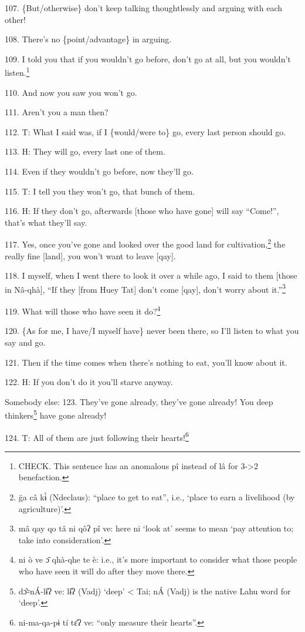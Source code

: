 107. \{But/otherwise\} don't keep talking thoughtlessly and arguing with each other!

108. There's no \{point/advantage\} in arguing.

109. I told you that if you wouldn't go before, don't go at all, but you wouldn't
listen.\footnote{CHECK. This sentence has an anomalous pî instead of lâ for 3->2 benefaction.}

110. And now you saw you won't go.

111. Aren't you a man then?

112. T: What I said was, if I \{would/were to\} go, every last person should go.

113. H: They will go, every last one of them.

114. Even if they wouldn't go before, now they'll go.

115. T: I tell you they won't go, that bunch of them.

116. H: If they don't go, afterwards [those who have gone] will say ``Come!'',
that's what they'll say.

117. Yes, once you've gone and looked over the good land for cultivation,\footnote{g̈a câ kɨ̀ (Ndeclaus): ``place to get to eat'', i.e., `place to earn a livelihood (by agriculture)'.} the
really fine [land], you won't want to leave [qay].

118. I myself, when I went there to look it over a while ago, I said to them [those
in Nâ-qhà], ``If they [from Huey Tat] don't come [qay], don't worry about it.''\footnote{mâ qay qo tâ ni qôʔ pî ve: here ni `look at' seems to mean `pay attention to; take into consideration'.}

119. What will those who have seen it do?\footnote{ni ò ve ɔ̄ qhà-qhe te è: i.e., it's more important to consider what those people who have seen it will do after they move there.}

120. \{As for me, I have/I myself have\} never been there, so I'll listen to what
you say and go.

121. Then if the time comes when there's nothing to eat, you'll know about it.

122. H: If you don't do it you'll starve anyway.

Somebody else: 123. They've gone already, they've gone already! You deep thinkers\footnote{dɔ̂꞊nÁ-lɨ̂ʔ ve: lɨ̂ʔ (Vadj) `deep' < Tai; nÁ (Vadj) is the native Lahu word for `deep'.}
have gone already!

124. T: All of them are just following their hearts!\footnote{ni-ma-qa-pɨ tí tɛ̂ʔ ve: ``only measure their hearts''.}

